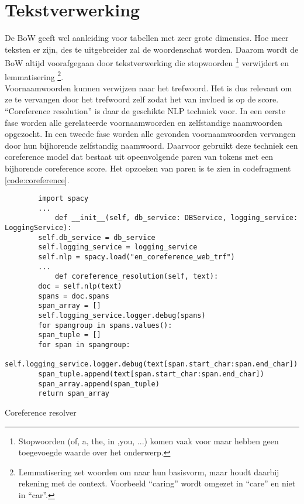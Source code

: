\section{Tekstverwerking}
De BoW geeft wel aanleiding voor tabellen met zeer grote dimensies. Hoe meer teksten er zijn, des te uitgebreider zal de woordenschat worden. Daarom wordt de BoW altijd voorafgegaan door tekstverwerking die stopwoorden \footnote{Stopwoorden (of, a, the, in ,you, ...) komen vaak voor maar hebben geen toegevoegde waarde over het onderwerp.} verwijdert en lemmatisering \footnote{Lemmatisering zet woorden om naar hun basisvorm, maar houdt daarbij rekening met de context. Voorbeeld ``caring'' wordt omgezet in ``care'' en niet in ``car''.}.\\
Voornaamwoorden kunnen verwijzen naar het trefwoord. Het is dus relevant om ze te vervangen door het trefwoord zelf zodat het van invloed is op de score. ``Coreference resolution'' is daar de geschikte NLP techniek voor. In een eerste fase worden alle gerelateerde voornaamwoorden en zelfstandige naamwoorden opgezocht. In een tweede fase worden alle gevonden voornaamwoorden vervangen door hun bijhorende zelfstandig naamwoord. Daarvoor gebruikt deze techniek een coreference model dat bestaat uit opeenvolgende paren van tokens met een bijhorende coreference score.
Het opzoeken van paren is te zien in codefragment \ref{code:coreference}.
\begin{listing}
    \begin{verbatim}
        import spacy
        ...
            def __init__(self, db_service: DBService, logging_service: LoggingService):
        self.db_service = db_service
        self.logging_service = logging_service
        self.nlp = spacy.load("en_coreference_web_trf")
        ...
            def coreference_resolution(self, text):
        doc = self.nlp(text)
        spans = doc.spans
        span_array = []
        self.logging_service.logger.debug(spans)
        for spangroup in spans.values():
        span_tuple = []
        for span in spangroup:
        self.logging_service.logger.debug(text[span.start_char:span.end_char])
        span_tuple.append(text[span.start_char:span.end_char])
        span_array.append(span_tuple)
        return span_array
    \end{verbatim}
    \caption[Coreference resolver]{Coreference resolver}
    \label{code:coreference}
\end{listing}
